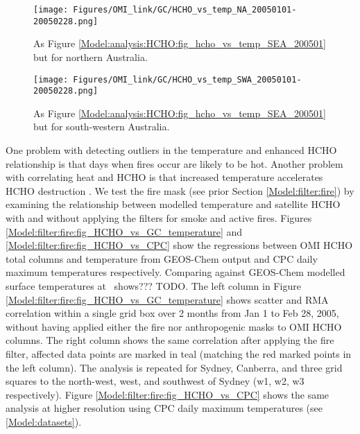   \begin{figure}
    \texttt{[image: Figures/OMI\_link/GC/HCHO\_vs\_temp\_NA\_20050101-20050228.png]}
    \caption{%
      As Figure \ref{Model:analysis:HCHO:fig_hcho_vs_temp_SEA_200501} but for northern Australia.
    }
    \label{Model:analysis:HCHO:fig_hcho_vs_temp_NA_200501}
  \end{figure}
  
  \begin{figure}
    \texttt{[image: Figures/OMI\_link/GC/HCHO\_vs\_temp\_SWA\_20050101-20050228.png]}
    \caption{%
      As Figure \ref{Model:analysis:HCHO:fig_hcho_vs_temp_SEA_200501} but for south-western Australia.
    }
    \label{Model:analysis:HCHO:fig_hcho_vs_temp_SWA_200501}
  \end{figure}
  
  One problem with detecting outliers in the temperature and enhanced HCHO relationship is that days when fires occur are likely to be hot.
  Another problem with correlating heat and HCHO is that increased temperature accelerates HCHO destruction \parencite{Zheng2015}.
  We test the fire mask (see prior Section \ref{Model:filter:fire}) by examining the relationship between modelled temperature and satellite HCHO with and without applying the filters for smoke and active fires.
  Figures \ref{Model:filter:fire:fig_HCHO_vs_GC_temperature} and \ref{Model:filter:fire:fig_HCHO_vs_CPC} show the regressions between OMI HCHO total columns and temperature from GEOS-Chem output and CPC daily maximum temperatures respectively.
  Comparing against GEOS-Chem modelled surface temperatures at \lowhr ~shows??? TODO.
  The left column in Figure \ref{Model:filter:fire:fig_HCHO_vs_GC_temperature} shows scatter and RMA correlation within a single grid box over 2 months from Jan 1 to Feb 28, 2005, without having applied either the fire nor anthropogenic masks to OMI HCHO columns. 
  The right column shows the same correlation after applying the fire filter, affected data points are marked in teal (matching the red marked points in the left column).
  The analysis is repeated for Sydney, Canberra, and three grid squares to the north-west, west, and southwest of Sydney (w1, w2, w3 respectively).
  Figure \ref{Model:filter:fire:fig_HCHO_vs_CPC} shows the same analysis at higher resolution using CPC daily maximum temperatures (see \ref{Model:datasets}).
  
  
